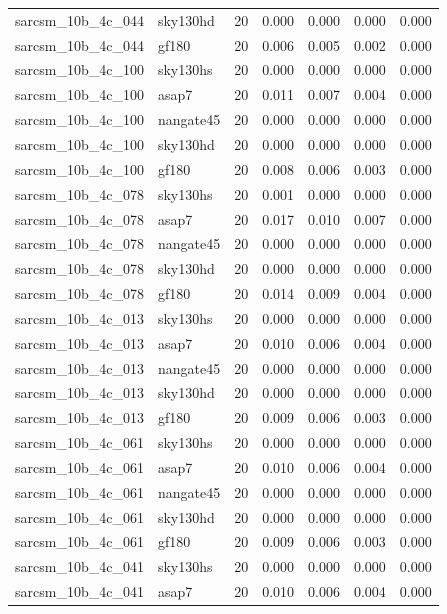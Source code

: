 \begin{tabular}{llrrrrr}
sarcsm\_10b\_4c\_044 & sky130hd & 20 & 0.000 & 0.000 & 0.000 & 0.000 \\
sarcsm\_10b\_4c\_044 & gf180 & 20 & 0.006 & 0.005 & 0.002 & 0.000 \\
sarcsm\_10b\_4c\_100 & sky130hs & 20 & 0.000 & 0.000 & 0.000 & 0.000 \\
sarcsm\_10b\_4c\_100 & asap7 & 20 & 0.011 & 0.007 & 0.004 & 0.000 \\
sarcsm\_10b\_4c\_100 & nangate45 & 20 & 0.000 & 0.000 & 0.000 & 0.000 \\
sarcsm\_10b\_4c\_100 & sky130hd & 20 & 0.000 & 0.000 & 0.000 & 0.000 \\
sarcsm\_10b\_4c\_100 & gf180 & 20 & 0.008 & 0.006 & 0.003 & 0.000 \\
sarcsm\_10b\_4c\_078 & sky130hs & 20 & 0.001 & 0.000 & 0.000 & 0.000 \\
sarcsm\_10b\_4c\_078 & asap7 & 20 & 0.017 & 0.010 & 0.007 & 0.000 \\
sarcsm\_10b\_4c\_078 & nangate45 & 20 & 0.000 & 0.000 & 0.000 & 0.000 \\
sarcsm\_10b\_4c\_078 & sky130hd & 20 & 0.000 & 0.000 & 0.000 & 0.000 \\
sarcsm\_10b\_4c\_078 & gf180 & 20 & 0.014 & 0.009 & 0.004 & 0.000 \\
sarcsm\_10b\_4c\_013 & sky130hs & 20 & 0.000 & 0.000 & 0.000 & 0.000 \\
sarcsm\_10b\_4c\_013 & asap7 & 20 & 0.010 & 0.006 & 0.004 & 0.000 \\
sarcsm\_10b\_4c\_013 & nangate45 & 20 & 0.000 & 0.000 & 0.000 & 0.000 \\
sarcsm\_10b\_4c\_013 & sky130hd & 20 & 0.000 & 0.000 & 0.000 & 0.000 \\
sarcsm\_10b\_4c\_013 & gf180 & 20 & 0.009 & 0.006 & 0.003 & 0.000 \\
sarcsm\_10b\_4c\_061 & sky130hs & 20 & 0.000 & 0.000 & 0.000 & 0.000 \\
sarcsm\_10b\_4c\_061 & asap7 & 20 & 0.010 & 0.006 & 0.004 & 0.000 \\
sarcsm\_10b\_4c\_061 & nangate45 & 20 & 0.000 & 0.000 & 0.000 & 0.000 \\
sarcsm\_10b\_4c\_061 & sky130hd & 20 & 0.000 & 0.000 & 0.000 & 0.000 \\
sarcsm\_10b\_4c\_061 & gf180 & 20 & 0.009 & 0.006 & 0.003 & 0.000 \\
sarcsm\_10b\_4c\_041 & sky130hs & 20 & 0.000 & 0.000 & 0.000 & 0.000 \\
sarcsm\_10b\_4c\_041 & asap7 & 20 & 0.010 & 0.006 & 0.004 & 0.000 \\

\end{tabular}
